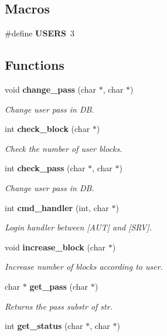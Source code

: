 \subsection*{Macros}
\begin{DoxyCompactItemize}
\item 
\#define \textbf{ U\+S\+E\+RS}~3
\end{DoxyCompactItemize}
\subsection*{Functions}
\begin{DoxyCompactItemize}
\item 
void \textbf{ change\+\_\+pass} (char $\ast$, char $\ast$)
\begin{DoxyCompactList}\small\item\em Change user pass in DB. \end{DoxyCompactList}\item 
int \textbf{ check\+\_\+block} (char $\ast$)
\begin{DoxyCompactList}\small\item\em Check the number of user blocks. \end{DoxyCompactList}\item 
int \textbf{ check\+\_\+pass} (char $\ast$, char $\ast$)
\begin{DoxyCompactList}\small\item\em Change user pass in DB. \end{DoxyCompactList}\item 
int \textbf{ cmd\+\_\+handler} (int, char $\ast$)
\begin{DoxyCompactList}\small\item\em Login handler between [A\+UT] and [S\+RV]. \end{DoxyCompactList}\item 
void \textbf{ increase\+\_\+block} (char $\ast$)
\begin{DoxyCompactList}\small\item\em Increase number of blocks according to user. \end{DoxyCompactList}\item 
char $\ast$ \textbf{ get\+\_\+pass} (char $\ast$)
\begin{DoxyCompactList}\small\item\em Returns the pass substr of str. \end{DoxyCompactList}\item 
int \textbf{ get\+\_\+status} (char $\ast$, char $\ast$)

\end{DoxyCompactItemize}
